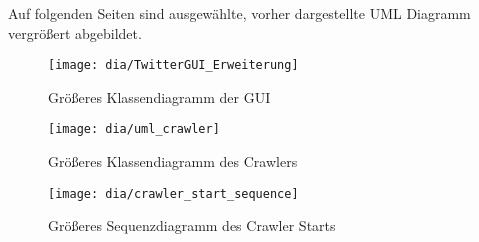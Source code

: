 Auf folgenden Seiten sind ausgewählte, vorher dargestellte UML Diagramm vergrößert abgebildet.

\begin{figure}[h!]
	\centering
	\texttt{[image: dia/TwitterGUI\_Erweiterung]}
	\caption{Größeres Klassendiagramm der GUI}
	\label{fig:gui_big}
\end{figure}
\begin{figure}[h!]
	\centering
	\texttt{[image: dia/uml\_crawler]}
	\caption{Größeres Klassendiagramm des Crawlers}
	\label{fig:crawler_big}
\end{figure}
\begin{figure}[h!]
	\centering
	\texttt{[image: dia/crawler\_start\_sequence]}
	\caption{Größeres Sequenzdiagramm des Crawler Starts}
	\label{fig:crawler_seq_big}
\end{figure}
